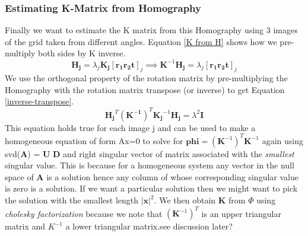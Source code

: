 \documentclass[titlepage]{article}
\begin{document}
\subsubsection{Estimating K-Matrix from Homography}
\label{estK}
Finally we want to estimate the K matrix from this Homography using 3 images of the grid taken from different angles. Equation \ref{K from H} shows how we pre-multiply both sides by K inverse.
\begin{equation}
    \label{K from H}
    \mathbf{H_j} = \lambda_j \mathbf{K_j} [\mathbf{r_1} \mathbf{r_2} \mathbf{t}]_j \implies \mathbf{K}^{-1} \mathbf{H_j} = \lambda_j [\mathbf{r_1} \mathbf{r_2} \mathbf{t}]_j
    \end{equation}
We use the orthogonal property of the rotation matrix by pre-multiplying the Homography with the rotation matrix transpose (or inverse) to get Equation \ref{inverse-transpose}.
    \begin{equation}
    \label{inverse-transpose}
        \mathbf{H_j}^T (\mathbf{K^{-1}})^{T} \mathbf{K_j}^{-1} \mathbf{H_j} = \lambda^2 \mathbf{I}
    \end{equation}
This equation holds true for each image j and can be used to make a homogeneous equation of form Ax=0 to solve for ${\mathbf{phi}} = (\mathbf{K}^{-1})^T \mathbf{K}^{-1}$ again using svd(\textbf{A}) = \textbf{U} \textbf{D}  and right singular vector of matrix \mathbf{$\phi$} associated with the \textit{smallest} singular value. This is because for a homogeneous system any vector  in the null space of \textbf{A} is a solution hence any column of  whose corresponding singular value is zero is a solution. If we want a particular solution then we might want to pick the solution  with the smallest length $|\mathbf{x}|^2$. We then obtain \textbf{K} from $\Phi$ using \textit{cholesky factorization} because we note that $(\mathbf{K}^{-1})^T$ is an upper triangular matrix and $K^{-1}$ a lower triangular matrix.{see discussion later?}
\end{document}
